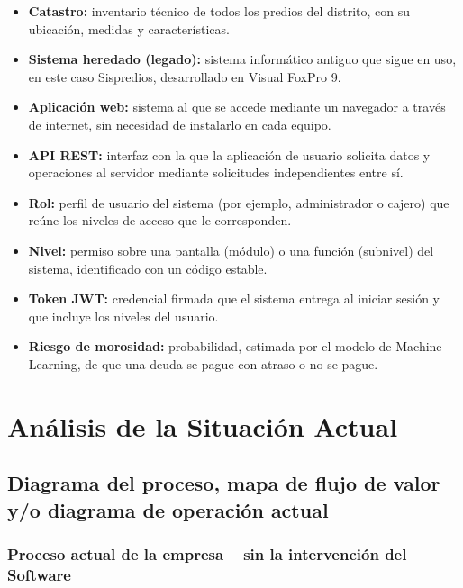 \documentclass[12pt,a4paper]{report}
\begin{document}
\begin{itemize}[leftmargin=1.25cm,itemsep=0pt,topsep=0pt]
  \item \textbf{Catastro:} inventario técnico de todos los predios del distrito, con su ubicación, medidas y características.
  \item \textbf{Sistema heredado (legado):} sistema informático antiguo que sigue en uso, en este caso Sispredios, desarrollado en Visual FoxPro 9.
  \item \textbf{Aplicación web:} sistema al que se accede mediante un navegador a través de internet, sin necesidad de instalarlo en cada equipo.
  \item \textbf{API REST:} interfaz con la que la aplicación de usuario solicita datos y operaciones al servidor mediante solicitudes independientes entre sí.
  \item \textbf{Rol:} perfil de usuario del sistema (por ejemplo, administrador o cajero) que reúne los niveles de acceso que le corresponden.
  \item \textbf{Nivel:} permiso sobre una pantalla (módulo) o una función (subnivel) del sistema, identificado con un código estable.
  \item \textbf{Token JWT:} credencial firmada que el sistema entrega al iniciar sesión y que incluye los niveles del usuario.
  \item \textbf{Riesgo de morosidad:} probabilidad, estimada por el modelo de Machine Learning, de que una deuda se pague con atraso o no se pague.
\end{itemize}

\chapter{Análisis de la Situación Actual}

\section{Diagrama del proceso, mapa de flujo de valor y/o diagrama de operación actual}

\subsection{Proceso actual de la empresa -- sin la intervención del Software}
\end{document}
